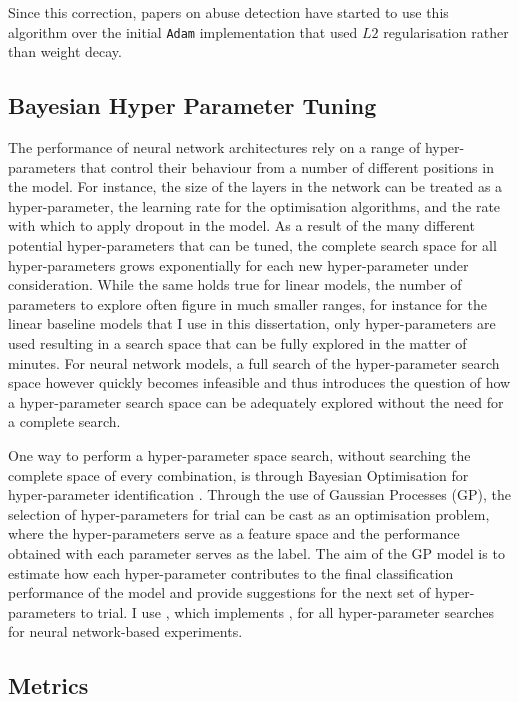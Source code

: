 Since this correction, papers on abuse detection have started to use this algorithm \citep{Rottger:2021,Vidgen:2020} over the initial \texttt{Adam} implementation that used $L2$ regularisation rather than weight decay.

\subsection{Bayesian Hyper Parameter Tuning}\label{sub:bho}
The performance of neural network architectures rely on a range of hyper-parameters that control their behaviour from a number of different positions in the model. For instance, the size of the layers in the network can be treated as a hyper-parameter, the learning rate for the optimisation algorithms, and the rate with which to apply dropout in the model.
As a result of the many different potential hyper-parameters that can be tuned, the complete search space for all hyper-parameters grows exponentially for each new hyper-parameter under consideration. 
While the same holds true for linear models, the number of parameters to explore often figure in much smaller ranges, for instance for the linear baseline models that I use in this dissertation, only hyper-parameters are used resulting in a search space that can be fully explored in the matter of minutes.
For neural network models, a full search of the hyper-parameter search space however quickly becomes infeasible and thus introduces the question of how a hyper-parameter search space can be adequately explored without the need for a complete search. 

One way to perform a hyper-parameter space search, without searching the complete space of every combination, is through Bayesian Optimisation for hyper-parameter identification \citep{Snoek:2012}. Through the use of Gaussian Processes (GP), the selection of hyper-parameters for trial can be cast as an optimisation problem, where the hyper-parameters serve as a feature space and the performance obtained with each parameter serves as the label.
The aim of the GP model is to estimate how each hyper-parameter contributes to the final classification performance of the model and provide suggestions for the next set of hyper-parameters to trial.
I use \citet{Wandb}, which implements \citet{Snoek:2012}, for all hyper-parameter searches for neural network-based experiments.

\subsection{Metrics}

